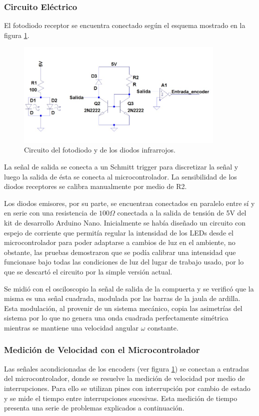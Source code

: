 \documentclass[10pt,conference,a4paper,onecolumn]{article}%
\begin{document}
\subsubsection{Circuito Eléctrico}
El fotodiodo receptor se encuentra conectado según el esquema mostrado en la figura \ref{fig:circuitoFotodiodo}.
\begin{figure}[h]
\centering
\includegraphics[width=10cm]{./imagenes/circuitoFotodiodo.jpeg}
\caption{Circuito del fotodiodo y de los diodos infrarrojos.}
\label{fig:circuitoFotodiodo}
\end{figure}
La señal de salida se conecta a un Schmitt trigger para discretizar la señal y luego la salida de ésta se conecta al microcontrolador. La sensibilidad de los diodos receptores se calibra manualmente por medio de R2.

Los diodos emisores, por su parte, se encuentran conectados en paralelo entre sí y en serie con una resistencia de $100 \Omega$ conectada a la salida de tensión de 5V del kit de desarrollo Arduino Nano. Inicialmente se había diseñado un circuito con espejo de corriente que permitía regular la intensidad de los LEDs desde el microcontrolador para poder adaptarse a cambios de luz en el ambiente, no obstante, las pruebas demostraron que se podía calibrar una intensidad que funcionase bajo todas las condiciones de luz del lugar de trabajo usado, por lo que se descartó el circuito por la simple versión actual.

Se midió con el osciloscopio la señal de salida de la compuerta y se verificó que la misma es una señal cuadrada, modulada por las barras de la jaula de ardilla. Esta modulación, al provenir de un sistema mecánico, copia las asimetrías del sistema por lo que no genera una onda cuadrada perfectamente simétrica mientras se mantiene una velocidad angular $\omega$ constante.

\subsubsection{Medición de Velocidad con el Microcontrolador}
Las señales acondicionadas de los encoders (ver figura \ref{fig:circuitoFotodiodo}) se conectan a entradas del microcontrolador, donde se resuelve la medición de velocidad por medio de interrupciones. Para ello se utilizan pines con interrupción
por cambio de estado y se mide el tiempo entre interrupciones sucesivas. Esta medición de tiempo presenta una serie de problemas explicados a continuación.
\end{document}

